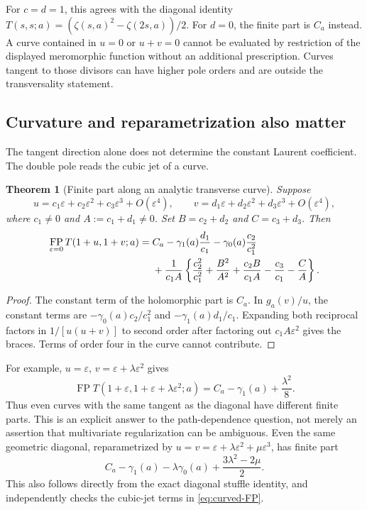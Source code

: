 \documentclass[11pt,letterpaper]{article}
\numberwithin{equation}{section}
\theoremstyle{plain}
\newtheorem{theorem}{Theorem}[section]
\theoremstyle{definition}
\theoremstyle{remark}
\DeclareMathOperator{\FP}{FP}
\newcommand{\eps}{\varepsilon}
\begin{document}
For $c=d=1$, this agrees with the diagonal identity
$T(s,s;a)=(\zeta(s,a)^2-\zeta(2s,a))/2$.
For $d=0$, the finite part is $C_a$ instead. A curve contained in
$u=0$ or $u+v=0$ cannot be evaluated by restriction of the displayed
meromorphic function without an additional prescription. Curves tangent
to those divisors can have higher pole orders and are outside the
transversality statement.

\subsection{Curvature and reparametrization also matter}

The tangent direction alone does not determine the constant Laurent
coefficient. The double pole reads the cubic jet of a curve.

\begin{theorem}[Finite part along an analytic transverse curve]
\label{thm:curved}
Suppose
\[
 u=c_1\eps+c_2\eps^2+c_3\eps^3+O(\eps^4),\qquad
 v=d_1\eps+d_2\eps^2+d_3\eps^3+O(\eps^4),
\]
where $c_1\ne0$ and $A:=c_1+d_1\ne0$. Set
$B=c_2+d_2$ and $C=c_3+d_3$. Then
\begin{align}\label{eq:curved-FP}
 \FP_{\eps=0}T(1+u,1+v;a)
 ={}&C_a-\gamma_1(a)\frac{d_1}{c_1}
             -\gamma_0(a)\frac{c_2}{c_1^2}\notag\\
 &+\frac1{c_1A}\left\{
       \frac{c_2^2}{c_1^2}+\frac{B^2}{A^2}
       +\frac{c_2B}{c_1A}-\frac{c_3}{c_1}-\frac CA
                         \right\}.
\end{align}
\end{theorem}
\begin{proof}
The constant term of the holomorphic part is $C_a$. In $g_a(v)/u$,
the constant terms are $-\gamma_0(a)c_2/c_1^2$ and
$-\gamma_1(a)d_1/c_1$. Expanding both reciprocal factors in
$1/[u(u+v)]$ to second order after factoring out $c_1A\eps^2$
gives the braces. Terms of order four in the curve cannot contribute.
\end{proof}

For example, $u=\eps$, $v=\eps+\lambda\eps^2$ gives
\begin{equation}\label{eq:curve-example}
 \FP T(1+\eps,1+\eps+\lambda\eps^2;a)
       =C_a-\gamma_1(a)+\frac{\lambda^2}{8}.
\end{equation}
Thus even curves with the same tangent as the diagonal have different
finite parts. This is an explicit answer to the path-dependence question,
not merely an assertion that multivariate regularization can be ambiguous.
Even the same geometric diagonal, reparametrized by
$u=v=\eps+\lambda\eps^2+\mu\eps^3$, has finite part
\[
 C_a-\gamma_1(a)-\lambda\gamma_0(a)+\frac{3\lambda^2-2\mu}{2}.
\]
This also follows directly from the exact diagonal stuffle identity,
and independently checks the cubic-jet terms in \eqref{eq:curved-FP}.
\end{document}
